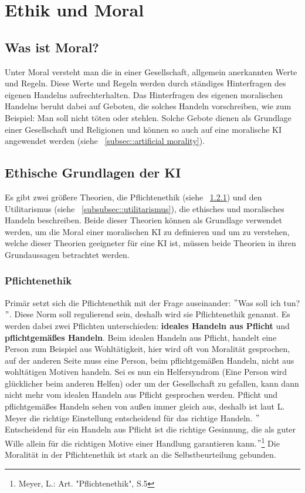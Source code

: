 \section{Ethik und Moral}\label{sec:ethik und moral}

\subsection{Was ist Moral?}\label{subsec::moral}

Unter Moral versteht man die in einer Gesellschaft, allgemein anerkannten Werte und Regeln.
Diese Werte und Regeln werden durch ständiges Hinterfragen des eigenen Handelns aufrechterhalten.
Das Hinterfragen des eigenen moralischen Handelns beruht dabei auf Geboten, die solches Handeln vorschreiben,
wie zum Beispiel: Man soll nicht töten oder stehlen.
Solche Gebote dienen als Grundlage einer Gesellschaft und Religionen und können so auch auf
eine moralische KI angewendet werden (siehe ~\ref{subsec::artificial morality}). %


\subsection{Ethische Grundlagen der KI}\label{subsec::ethische grundlagen}

Es gibt zwei größere Theorien, die Pflichtenethik (siehe ~\ref{subsubsec::pflichtenethik}) und den Utilitarismus (siehe ~\ref{subsubsec::utilitarismus}),
die ethisches und moralisches Handeln beschreiben.
Beide dieser Theorien können als Grundlage verwendet werden, um die Moral einer moralischen KI zu definieren und um zu verstehen, welche
dieser Theorien geeigneter für eine KI ist, müssen beide Theorien in ihren Grundaussagen betrachtet werden.

\subsubsection{Pflichtenethik}\label{subsubsec::pflichtenethik}

Primär setzt sich die Pflichtenethik mit der Frage auseinander: \("\)Was soll ich tun?\("\).
Diese Norm soll regulierend sein, deshalb wird sie Pflichtenethik genannt.
Es werden dabei zwei Pflichten unterschieden:
\textbf{ideales Handeln aus Pflicht} und \textbf{pflichtgemäßes Handeln}.
Beim idealen Handeln aus Pflicht, handelt eine Person zum Beispiel aus Wohltätigkeit,
hier wird oft von Moralität gesprochen, auf der
anderen Seite muss eine Person, beim pflichtgemäßen Handeln, nicht aus wohltätigen Motiven handeln.
Sei es nun ein Helfersyndrom (Eine Person wird glücklicher beim anderen Helfen) oder um der Gesellschaft zu gefallen,
kann dann nicht mehr vom idealen Handeln aus Pflicht gesprochen werden.
Pflicht und pflichtgemäßes Handeln sehen von außen immer gleich aus, deshalb ist laut L. Meyer die richtige
Einstellung entscheidend für das richtige Handeln.
\("\)Entscheidend für ein Handeln aus Pflicht ist die richtige Gesinnung,
die als guter Wille allein für die richtigen Motive einer Handlung garantieren kann.\("\)\footnote{ Meyer, L.: Art. "Pflichtenethik", S.5}
Die Moralität in der Pflichtenethik ist stark an die Selbstbeurteilung gebunden.


